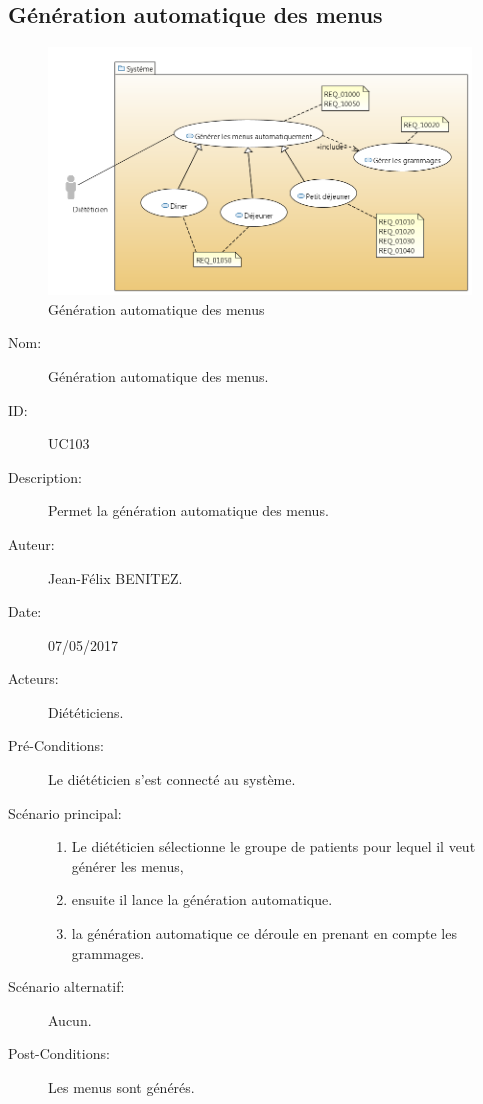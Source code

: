 \subsection{Génération automatique des menus}
\begin{figure}[H]
\label{MenuGen}
  \centering
      \includegraphics[width=1.00\textwidth]{../../CasDUtilisations/MenuGen/MenuGen.png} %
\caption{Génération automatique des menus}
\end{figure}

\begin{description}
\item[Nom:] Génération automatique des menus.
\item[ID:] UC103
\item[Description:] Permet la génération automatique des menus.
\item[Auteur:] Jean-Félix BENITEZ.
\item[Date:] 07/05/2017
\item[Acteurs:] Diététiciens.
\item[Pré-Conditions:] Le diététicien s'est connecté au système.
\item[Scénario principal:]
  \begin{enumerate}
  \item Le diététicien sélectionne le groupe de patients pour lequel il veut générer les menus,
  \item ensuite il lance la génération automatique.
  \item la génération automatique ce déroule en prenant en compte les grammages.
  \end{enumerate}
\item[Scénario alternatif:] Aucun.
\item[Post-Conditions:] Les menus sont générés.
\end{description}

